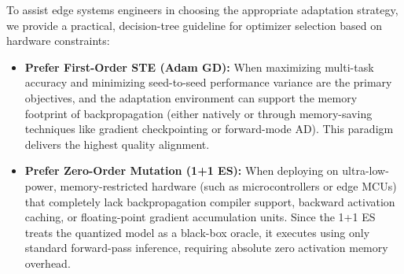 To assist edge systems engineers in choosing the appropriate adaptation strategy, we provide a practical, decision-tree guideline for optimizer selection based on hardware constraints:
\begin{itemize}
    \item \textbf{Prefer First-Order STE (Adam GD):} When maximizing multi-task accuracy and minimizing seed-to-seed performance variance are the primary objectives, and the adaptation environment can support the memory footprint of backpropagation (either natively or through memory-saving techniques like gradient checkpointing or forward-mode AD). This paradigm delivers the highest quality alignment.
    \item \textbf{Prefer Zero-Order Mutation (1+1 ES):} When deploying on ultra-low-power, memory-restricted hardware (such as microcontrollers or edge MCUs) that completely lack backpropagation compiler support, backward activation caching, or floating-point gradient accumulation units. Since the 1+1 ES treats the quantized model as a black-box oracle, it executes using only standard forward-pass inference, requiring absolute zero activation memory overhead.
\end{itemize}